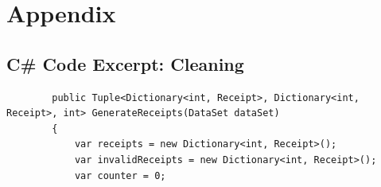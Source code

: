 \documentclass{article}
\begin{document}

    \newpage
    \section{Appendix}
    \label{sec:Appendix}

    \subsection{C\# Code Excerpt: Cleaning}
    \label{sec:sharpccleaning}
    \lstset{style=sharpc}
    \begin{lstlisting}
        public Tuple<Dictionary<int, Receipt>, Dictionary<int, Receipt>, int> GenerateReceipts(DataSet dataSet)
        {
            var receipts = new Dictionary<int, Receipt>();
            var invalidReceipts = new Dictionary<int, Receipt>();
            var counter = 0;


\end{lstlisting}
\end{document}
